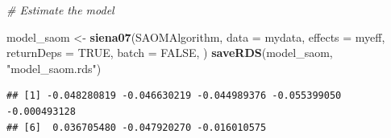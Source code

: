 \documentclass[
]{article}
\newenvironment{Shaded}{\begin{snugshade}}{\end{snugshade}}
\newcommand{\AttributeTok}[1]{\textcolor[rgb]{0.13,0.29,0.53}{#1}}
\newcommand{\CommentTok}[1]{\textcolor[rgb]{0.56,0.35,0.01}{\textit{#1}}}
\newcommand{\ConstantTok}[1]{\textcolor[rgb]{0.56,0.35,0.01}{#1}}
\newcommand{\DecValTok}[1]{\textcolor[rgb]{0.00,0.00,0.81}{#1}}
\newcommand{\FunctionTok}[1]{\textcolor[rgb]{0.13,0.29,0.53}{\textbf{#1}}}
\newcommand{\NormalTok}[1]{#1}
\newcommand{\OtherTok}[1]{\textcolor[rgb]{0.56,0.35,0.01}{#1}}
\newcommand{\SpecialCharTok}[1]{\textcolor[rgb]{0.81,0.36,0.00}{\textbf{#1}}}
\newcommand{\StringTok}[1]{\textcolor[rgb]{0.31,0.60,0.02}{#1}}
\begin{document}
\begin{Shaded}
\begin{Highlighting}[]
\CommentTok{\# Estimate the model}
\end{Highlighting}
\end{Shaded}

\begin{Shaded}
\begin{Highlighting}[]
\NormalTok{model\_saom }\OtherTok{\textless{}{-}} \FunctionTok{siena07}\NormalTok{(SAOMAlgorithm,}
                \AttributeTok{data =}\NormalTok{ mydata, }
                \AttributeTok{effects =}\NormalTok{ myeff, }
                \AttributeTok{returnDeps =} \ConstantTok{TRUE}\NormalTok{, }
                \AttributeTok{batch =} \ConstantTok{FALSE}\NormalTok{,}
\NormalTok{                )}
\FunctionTok{saveRDS}\NormalTok{(model\_saom, }\StringTok{"model\_saom.rds"}\NormalTok{)}
\end{Highlighting}
\end{Shaded}

\begin{Shaded}
\end{Shaded}

\begin{verbatim}
## [1] -0.048280819 -0.046630219 -0.044989376 -0.055399050 -0.000493128
## [6]  0.036705480 -0.047920270 -0.016010575
\end{verbatim}

\begin{Shaded}
\end{Shaded}
\end{document}
